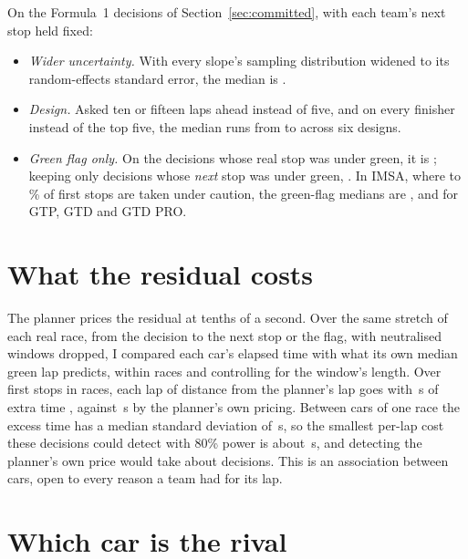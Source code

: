 \documentclass[11pt,a4paper]{article}
\begin{document}
On the Formula~1 decisions of Section~\ref{sec:committed}, with each team's next
stop held fixed:
\begin{itemize}
\item \emph{Wider uncertainty.} With every slope's sampling distribution widened
to its random-effects standard error, the median is \WideMedian{} \WideCi{}.
\item \emph{Design.} Asked ten or fifteen laps ahead instead of five, and on every
finisher instead of the top five, the median runs from \DesignMinMedian{} to
\DesignMaxMedian{} across six designs.
\item \emph{Green flag only.} On the \FoneGreenN{} decisions whose real stop was
under green, it is \FoneGreenMedian{} \FoneGreenCi{}; keeping only decisions
whose \emph{next} stop was under green, \CommitGreenAfter{} \CommitGreenCi{}.
In IMSA, where \ImsaCautionMin{} to \ImsaCautionMax{}\% of first stops are
taken under caution, the green-flag medians are \ImsaGtpGreenMedian{},
\ImsaGtdGreenMedian{} and \ImsaGtdproGreenMedian{} for GTP, GTD and GTD PRO.
\end{itemize}

\section{What the residual costs}
\label{sec:deviationcost}

The planner prices the residual at tenths of a second. Over the same stretch of
each real race, from the decision to the next stop or the flag, with
neutralised windows dropped, I compared each car's elapsed time with what its own
median green lap predicts, within races and controlling for the window's length.
Over \NDeviationCars{} first stops in \NDeviationRaces{} races, each lap of
distance from the planner's lap goes with \DeviationPerLap{}\,s of extra time
\DeviationPerLapCi{}, against \DeviationPlannerPerLap{}\,s by the planner's
own pricing. Between cars of one race the excess time has a median standard
deviation of \DeviationSpread{}\,s, so the smallest per-lap cost these decisions
could detect with 80\% power is about \DeviationMde{}\,s, and detecting the
planner's own price would take about \DeviationNeeded{} decisions. This is an
association between cars, open to every reason a team had for its lap.

\section{Which car is the rival}
\label{sec:rivalchoice}
\end{document}

